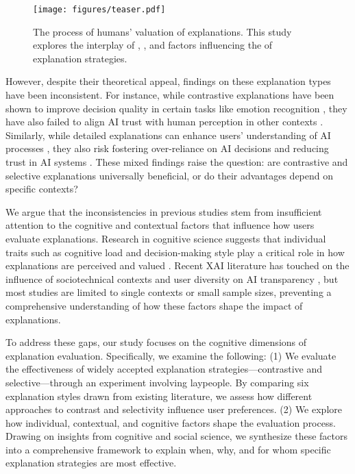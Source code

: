 \begin{figure}[t]%
\centering
\texttt{[image: figures/teaser.pdf]}
\caption{The process of humans' valuation of explanations. This study explores the interplay of , , and  factors influencing the  of explanation strategies.}
\label{fig:teaser}
\end{figure}

However, despite their theoretical appeal, findings on these explanation types have been inconsistent. For instance, while contrastive explanations have been shown to improve decision quality in certain tasks like emotion recognition \cite{RelatableExplainableAIPerceptualProcess}, they have also failed to align AI trust with human perception in other contexts \cite{AreExplanationsHelpfulComparative}. Similarly, while detailed explanations can enhance users' understanding of AI processes \cite{TooMuchTooLittlea, ExplainableAutonomyStudyExplanation}, they also risk fostering over-reliance on AI decisions \cite{RoleExplanationsTrustReliance} and reducing trust in AI systems \cite{HowMuchInformationEffects}. These mixed findings raise the question: are contrastive and selective explanations universally beneficial, or do their advantages depend on specific contexts?

We argue that the inconsistencies in previous studies stem from insufficient attention to the cognitive and contextual factors that influence how users evaluate explanations. Research in cognitive science suggests that individual traits such as cognitive load and decision-making style play a critical role in how explanations are perceived and valued \cite{PartneringPeopleDeepLearning, SpanishvalidationGeneralDecisionMakingStyle}. Recent XAI literature has touched on the influence of sociotechnical contexts and user diversity on AI transparency \cite{CapturingTrendsApplicationsIssues, ScienceHumanAIDecisionMakingSurvey, ehsan2023charting}, but most studies are limited to single contexts or small sample sizes, preventing a comprehensive understanding of how these factors shape the impact of explanations.

To address these gaps, our study focuses on the cognitive dimensions of explanation evaluation. Specifically, we examine the following:
(1) We evaluate the effectiveness of widely accepted explanation strategies---contrastive and selective---through an experiment involving laypeople. By comparing six explanation styles drawn from existing literature, we assess how different approaches to contrast and selectivity influence user preferences.
(2) We explore how individual, contextual, and cognitive factors shape the evaluation process. Drawing on insights from cognitive and social science, we synthesize these factors into a comprehensive framework to explain when, why, and for whom specific explanation strategies are most effective.

